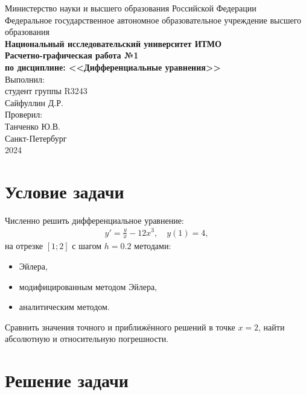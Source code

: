\documentclass[a4paper,12pt]{article}
\begin{document}
\begin{titlepage}
    \centering
    {\large Министерство науки и высшего образования Российской Федерации\\Федеральное государственное автономное образовательное учреждение высшего образования\\\textbf{Национальный исследовательский университет ИТМО}}\\
    \vspace{4cm}
    {\Large\textbf{Расчетно-графическая работа №1}}\\
    \vspace{1cm}
    \textbf{по дисциплине: <<Дифференциальные уравнения>>}\\
    \vspace{5cm}
    \hfill Выполнил:\\
    \hfill студент группы R3243\\
    \hfill Сайфуллин Д.Р.\\
    \vspace{1cm}
    \hfill Проверил:\\
    \hfill Танченко Ю.В.\\
    \vfill
    Санкт-Петербург\\
    2024
\end{titlepage}

\section*{Условие задачи}
Численно решить дифференциальное уравнение:
\begin{align*}
    y' = \frac{y}{x} - 12x^3, \quad y(1) = 4,
\end{align*}
на отрезке $[1;2]$ с шагом $h = 0.2$ методами:
\begin{itemize}
    \item Эйлера,
    \item модифицированным методом Эйлера,
    \item аналитическим методом.
\end{itemize}
Сравнить значения точного и приближённого решений в точке $x = 2$, найти абсолютную и относительную погрешности.

\section*{Решение задачи}
\end{document}
